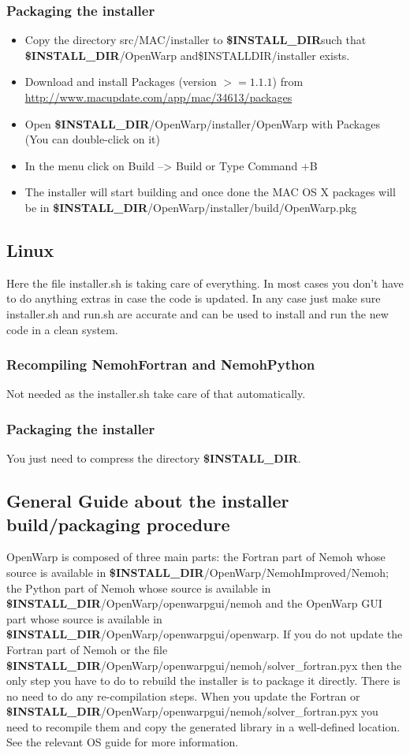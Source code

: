 \documentclass[12pt]{article}
\newcommand{\INSTALLDIR}{{\textbf{\$INSTALL{\_}DIR}}}
\begin{document}
\subsubsection{Packaging the installer}

\begin{itemize}
	\item Copy the directory src/MAC/installer to \INSTALLDIR such that \INSTALLDIR/OpenWarp and\$INSTALLDIR/installer exists.
\item Download and install Packages (version $>= 1.1.1$) from \url{http://www.macupdate.com/app/mac/34613/packages}
\item Open \INSTALLDIR/OpenWarp/installer/OpenWarp with Packages (You can double-click on it)
\item In the menu click on Build --> Build or Type Command +B
\item The installer will start building and once done the MAC OS X packages will be in \INSTALLDIR/OpenWarp/installer/build/OpenWarp.pkg
\end{itemize}

\subsection{Linux}

Here the file installer.sh is taking care of everything. In most cases you don't have to do anything extras in case the code is updated. In any case just make sure installer.sh and run.sh are accurate and can be used to install and run the new code in a clean system.

\subsubsection{Recompiling NemohFortran and NemohPython}
Not needed as the installer.sh take care of that automatically.
\subsubsection{Packaging the installer}
You just need to compress the directory \INSTALLDIR.

\subsection{General Guide about the installer build/packaging procedure}

OpenWarp is composed of three main parts: the Fortran part of Nemoh whose source is available in \INSTALLDIR/OpenWarp/NemohImproved/Nemoh; the Python part of Nemoh whose source is available in \INSTALLDIR/OpenWarp/openwarpgui/nemoh and the OpenWarp GUI part whose source is available in \INSTALLDIR/OpenWarp/openwarpgui/openwarp.
If you do not update the Fortran part of Nemoh or the file \INSTALLDIR/OpenWarp/openwarpgui/nemoh/solver_fortran.pyx then the only step you have to do to rebuild the installer is to package it directly. There is no need to do any re-compilation steps.
When you update the Fortran or \INSTALLDIR/OpenWarp/openwarpgui/nemoh/solver_fortran.pyx you need to recompile them and copy the generated library in a well-defined location. See the relevant OS guide for more information.
\end{document}
